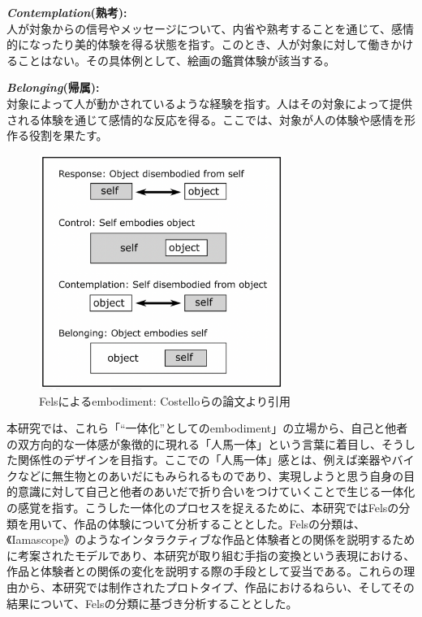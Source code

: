 \textbf{\textit{Contemplation}(熟考):}\\
人が対象からの信号やメッセージについて、内省や熟考することを通じて、感情的になったり美的体験を得る状態を指す。このとき、人が対象に対して働きかけることはない。その具体例として、絵画の鑑賞体験が該当する。

\textbf{\textit{Belonging}(帰属):}\\
対象によって人が動かされているような経験を指す。人はその対象によって提供される体験を通じて感情的な反応を得る。ここでは、対象が人の体験や感情を形作る役割を果たす。

\begin{figure}[H]
  \centering
  \includegraphics[width=8cm]{img/fels_diagram.png}
  \caption{Felsによるembodiment: Costelloらの論文より引用}
  \label{fig:fels_embodiment}
\end{figure}

本研究では、これら「``一体化''としてのembodiment」の立場から、自己と他者の双方向的な一体感が象徴的に現れる「人馬一体」という言葉に着目し、そうした関係性のデザインを目指す。ここでの「人馬一体」感とは、例えば楽器やバイクなどに無生物とのあいだにもみられるものであり、実現しようと思う自身の目的意識に対して自己と他者のあいだで折り合いをつけていくことで生じる一体化の感覚を指す。こうした一体化のプロセスを捉えるために、本研究ではFelsの分類を用いて、作品の体験について分析することとした。Felsの分類は、《Iamascope》のようなインタラクティブな作品と体験者との関係を説明するために考案されたモデルであり、本研究が取り組む手指の変換という表現における、作品と体験者との関係の変化を説明する際の手段として妥当である。これらの理由から、本研究では制作されたプロトタイプ、作品におけるねらい、そしてその結果について、Felsの分類に基づき分析することとした。